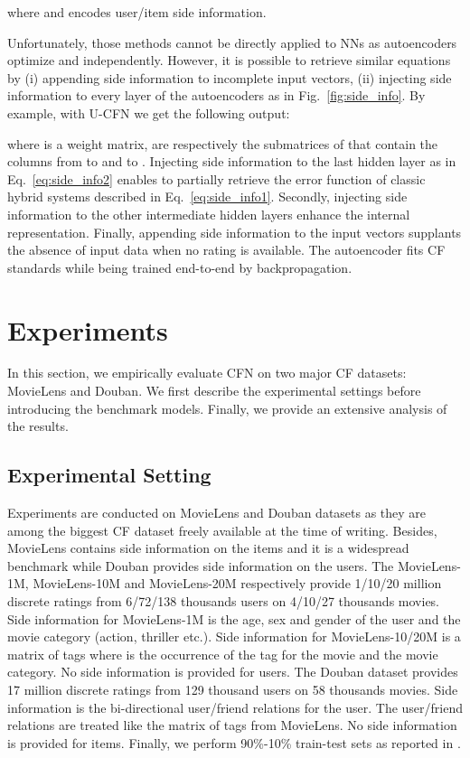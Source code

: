 \documentclass{article}
\begin{document}
where  and  encodes user/item side information.

Unfortunately, those methods cannot be directly applied to NNs as autoencoders optimize  and  independently. However, it is possible to retrieve similar equations by (i) appending side information to incomplete input vectors, (ii) injecting side information to every layer of the autoencoders as in Fig.~\ref{fig:side_info}. By example, with U-CFN we get the following output:

where  is a weight matrix,  are respectively the submatrices of  that contain the columns from  to  and  to . 
Injecting side information to the last hidden layer as in Eq.~\ref{eq:side_info2} enables to partially retrieve the error function of classic hybrid systems described in Eq.~\ref{eq:side_info1}. Secondly, injecting side information to the other intermediate hidden layers enhance the internal representation. Finally, appending side information to the input vectors supplants the absence of input data when no rating is available. The autoencoder fits CF standards while being trained end-to-end by backpropagation. 

\section{Experiments}
\label{sec:exp}
In this section, we empirically evaluate CFN on two major CF datasets: MovieLens and Douban. We first describe the experimental settings before introducing the benchmark models. Finally, we provide an extensive analysis of the results.

\subsection{Experimental Setting}
Experiments are conducted on MovieLens and Douban datasets as they are among the biggest CF dataset freely available at the time of writing. Besides, MovieLens contains side information on the items and it is a widespread benchmark while Douban provides side information on the users. The MovieLens-1M, MovieLens-10M and Movie\-Lens-20M  respectively provide 1/10/20 million discrete ratings from 6/72/138 thousands users on 4/10/27 thousands movies. Side information for MovieLens-1M is the age, sex and gender of the user and the movie category (action, thriller etc.). Side information for MovieLens-10/20M is a matrix of tags  where  is the occurrence of the  tag for the  movie and the movie category. No side information is provided for users. The Douban dataset \cite{Hao2011} provides 17 million discrete ratings from 129 thousand users on 58 thousands movies. Side information is the bi-directional user/friend relations for the user. The user/friend relations are treated like the matrix of tags from MovieLens. No side information is provided for items.
Finally, we perform 90\%-10\% train-test sets as reported in \cite{Lee2013,Li2016,Zheng2016}.
\end{document}
